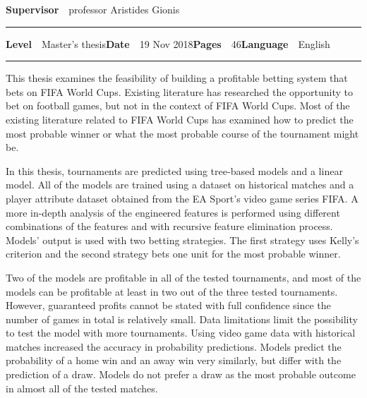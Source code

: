 \begin{spacing}{.88}
{{\fontsize{10.5pt}{10.5pt}\bfseries\sffamily\lsstyle Supervisor}~~{\small professor Aristides Gionis}

\vspace{-2.4mm}\rule{\textwidth}{.75pt}

{\fontsize{10.5pt}{10.5pt}\bfseries\sffamily\lsstyle Level}~~{\small Master's thesis}\hfill{\fontsize{10.5pt}{10.5pt}\bfseries\sffamily\lsstyle Date}~~{\small 19 Nov 2018}\hfill{\fontsize{10.5pt}{10.5pt}\bfseries\sffamily\lsstyle Pages}~~{\small 46}\hfill{\fontsize{10.5pt}{10.5pt}\bfseries\sffamily\lsstyle Language}~~{\small English}

\vspace{-2.4mm}\rule{\textwidth}{.75pt}

\vspace{6mm}

} %
\end{spacing}
\begin{spacing}{1.05}

\vspace{.8mm}

{\small
  This thesis examines the feasibility of building a profitable betting system that bets on FIFA World Cups. Existing literature has researched the opportunity to bet on football games, but not in the context of FIFA World Cups. Most of the existing literature related to FIFA World Cups has examined how to predict the most probable winner or what the most probable course of the tournament might be.

  In this thesis, tournaments are predicted using tree-based models and a linear model. All of the models are trained using a dataset on historical matches and a player attribute dataset obtained from the EA Sport's video game series FIFA. A more in-depth analysis of the engineered features is performed using different combinations of the features and with recursive feature elimination process. Models' output is used with two betting strategies. The first strategy uses Kelly's criterion and the second strategy bets one unit for the most probable winner.

  Two of the models are profitable in all of the tested tournaments, and most of the models can be profitable at least in two out of the three tested tournaments. However, guaranteed profits cannot be stated with full confidence since the number of games in total is relatively small. Data limitations limit the possibility to test the model with more tournaments. Using video game data with historical matches increased the accuracy in probability predictions. Models predict the probability of a home win and an away win very similarly, but differ with the prediction of a draw. Models do not prefer a draw as the most probable outcome in almost all of the tested matches.
}

\vfill

\end{spacing}

